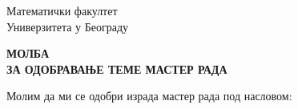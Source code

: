 \documentclass[a4paper]{article}
\begin{document}
\thispagestyle{empty}

\begin{flushleft}
Математички факултет\\
Универзитета у Београду
\end{flushleft}

\bigskip

\begin{center}
\textbf{МОЛБА\\
ЗА ОДОБРАВАЊЕ ТЕМЕ МАСТЕР РАДА
}\end{center}

\bigskip

\vspace*{-5mm}
\begin{flushleft}
Молим да ми се одобри израда мастер рада под насловом:
\end{flushleft}
\end{document}
